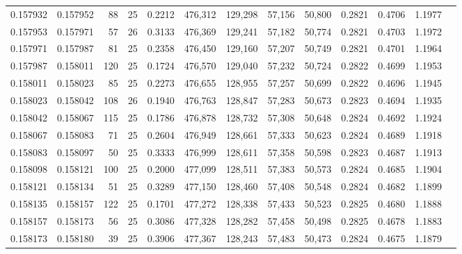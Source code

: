 \begin{tabular}{rrrrrrrrrrrrr}
0.157932 & 0.157952 &    88 &  25 &                                     0.2212 & 476,312 & 129,298 &  57,156 &  50,800 & 0.2821 & 0.4706 & 1.1977 \\
0.157953 & 0.157971 &    57 &  26 &                                     0.3133 & 476,369 & 129,241 &  57,182 &  50,774 & 0.2821 & 0.4703 & 1.1972 \\
0.157971 & 0.157987 &    81 &  25 &                                     0.2358 & 476,450 & 129,160 &  57,207 &  50,749 & 0.2821 & 0.4701 & 1.1964 \\
0.157987 & 0.158011 &   120 &  25 &                                     0.1724 & 476,570 & 129,040 &  57,232 &  50,724 & 0.2822 & 0.4699 & 1.1953 \\
0.158011 & 0.158023 &    85 &  25 &                                     0.2273 & 476,655 & 128,955 &  57,257 &  50,699 & 0.2822 & 0.4696 & 1.1945 \\
0.158023 & 0.158042 &   108 &  26 &                                     0.1940 & 476,763 & 128,847 &  57,283 &  50,673 & 0.2823 & 0.4694 & 1.1935 \\
0.158042 & 0.158067 &   115 &  25 &                                     0.1786 & 476,878 & 128,732 &  57,308 &  50,648 & 0.2824 & 0.4692 & 1.1924 \\
0.158067 & 0.158083 &    71 &  25 &                                     0.2604 & 476,949 & 128,661 &  57,333 &  50,623 & 0.2824 & 0.4689 & 1.1918 \\
0.158083 & 0.158097 &    50 &  25 &                                     0.3333 & 476,999 & 128,611 &  57,358 &  50,598 & 0.2823 & 0.4687 & 1.1913 \\
0.158098 & 0.158121 &   100 &  25 &                                     0.2000 & 477,099 & 128,511 &  57,383 &  50,573 & 0.2824 & 0.4685 & 1.1904 \\
0.158121 & 0.158134 &    51 &  25 &                                     0.3289 & 477,150 & 128,460 &  57,408 &  50,548 & 0.2824 & 0.4682 & 1.1899 \\
0.158135 & 0.158157 &   122 &  25 &                                     0.1701 & 477,272 & 128,338 &  57,433 &  50,523 & 0.2825 & 0.4680 & 1.1888 \\
0.158157 & 0.158173 &    56 &  25 &                                     0.3086 & 477,328 & 128,282 &  57,458 &  50,498 & 0.2825 & 0.4678 & 1.1883 \\
0.158173 & 0.158180 &    39 &  25 &                                     0.3906 & 477,367 & 128,243 &  57,483 &  50,473 & 0.2824 & 0.4675 & 1.1879 \\

\end{tabular}
